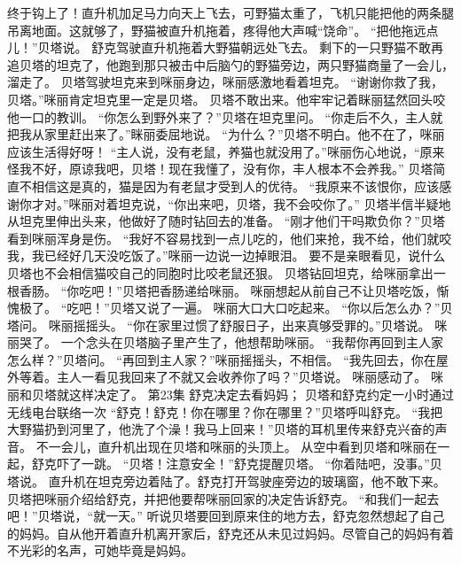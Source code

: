 \documentclass[a4paper,12pt,UTF8,twoside]{ctexbook}
\begin{document}
        终于钩上了！直升机加足马力向天上飞去，可野猫太重了，飞机只能把他的两条腿吊离地面。这就够了，野猫被直升机拖着，疼得他大声喊“饶命”。 
        “把他拖远点儿！”贝塔说。 
        舒克驾驶直升机拖着大野猫朝远处飞去。 
        剩下的一只野猫不敢再追贝塔的坦克了，他跑到那只被击中后脑勺的野猫旁边，两只野猫商量了一会儿，溜走了。 
        贝塔驾驶坦克来到咪丽身边，咪丽感激地看着坦克。 
        “谢谢你救了我，贝塔。”咪丽肯定坦克里一定是贝塔。 
        贝塔不敢出来。他牢牢记着眯丽猛然回头咬他一口的教训。 
        “你怎么到野外来了？”贝塔在坦克里问。 
        “你走后不久，主人就把我从家里赶出来了。”眯丽委屈地说。 
        “为什么？”贝塔不明白。他不在了，咪丽应该生活得好呀！ 
        “主人说，没有老鼠，养猫也就没用了。”咪丽伤心地说，“原来怪我不好，原谅我吧，贝塔！现在我懂了，没有你，丰人根本不会养我。” 
        贝塔简直不相信这是真的，猫是因为有老鼠才受到人的优待。 
        “我原来不该恨你，应该感谢你才对。”咪丽对着坦克说，“你出来吧，贝塔，我不会咬你了。” 
        贝塔半信半疑地从坦克里伸出头来，他做好了随时钻回去的准备。 
        “刚才他们干吗欺负你？”贝塔看到咪丽浑身是伤。 
        “我好不容易找到一点儿吃的，他们来抢，我不给，他们就咬我，我已经好几天没吃饭了。”咪丽一边说一边掉眼泪。 
        要不是亲眼看见，说什么贝塔也不会相信猫咬自己的同胞时比咬老鼠还狠。 
        贝塔钻回坦克，给咪丽拿出一根香肠。 
        “你吃吧！”贝塔把香肠递给咪丽。 
        咪丽想起从前自己不让贝塔吃饭，惭愧极了。 
        “吃吧！”贝塔又说了一遍。 
        咪丽大口大口吃起来。 
        “你以后怎么办？”贝塔问。 
        咪丽摇摇头。 
        “你在家里过惯了舒服日子，出来真够受罪的。”贝塔说。 
        咪丽哭了。 
        一个念头在贝塔脑子里产生了，他想帮助咪丽。 
        “我帮你再回到主人家怎么样？”贝塔问。 
        “再回到主人家？”咪丽摇摇头，不相信。 
        “我先回去，你在屋外等着。主人一看见我回来了不就又会收养你了吗？”贝塔说。 
        咪丽感动了。 
        咪丽和贝塔就这样决定了。   第23集 
        舒克决定去看妈妈； 
        贝塔和舒克约定一小时通过无线电台联络一次   
        “舒克！舒克！你在哪里？你在哪里？”贝塔呼叫舒克。 
        “我把大野猫扔到河里了，他洗了个澡！我马上回来！”贝塔的耳机里传来舒克兴奋的声音。 
        不一会儿，直升机出现在贝塔和咪丽的头顶上。 
        从空中看到贝塔和咪丽在一起，舒克吓了一跳。 
        “贝塔！注意安全！”舒克提醒贝塔。 
        “你着陆吧，没事。”贝塔说。 
        直升机在坦克旁边着陆了。舒克打开驾驶座旁边的玻璃窗，他不敢下来。 
        贝塔把咪丽介绍给舒克，并把他要帮咪丽回家的决定告诉舒克。 
        “和我们一起去吧！”贝塔说，“就一天。” 
        听说贝塔要回到原来住的地方去，舒克忽然想起了自己的妈妈。自从他开着直升机离开家后，舒克还从未见过妈妈。尽管自己的妈妈有着不光彩的名声，可她毕竟是妈妈。 
\end{document}
